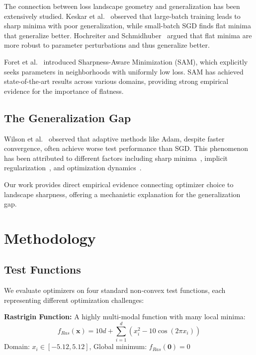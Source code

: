 \documentclass[12pt,a4paper]{article}
\begin{document}
The connection between loss landscape geometry and generalization has been extensively studied. Keskar et al.~\cite{keskar2016large} observed that large-batch training leads to sharp minima with poor generalization, while small-batch SGD finds flat minima that generalize better. Hochreiter and Schmidhuber~\cite{hochreiter1997flat} argued that flat minima are more robust to parameter perturbations and thus generalize better.

Foret et al.~\cite{foret2020sharpness} introduced Sharpness-Aware Minimization (SAM), which explicitly seeks parameters in neighborhoods with uniformly low loss. SAM has achieved state-of-the-art results across various domains, providing strong empirical evidence for the importance of flatness.

\subsection{The Generalization Gap}

Wilson et al.~\cite{wilson2017marginal} observed that adaptive methods like Adam, despite faster convergence, often achieve worse test performance than SGD. This phenomenon has been attributed to different factors including sharp minima~\cite{keskar2016large}, implicit regularization~\cite{smith2021origin}, and optimization dynamics~\cite{jastrzebski2017three}.

Our work provides direct empirical evidence connecting optimizer choice to landscape sharpness, offering a mechanistic explanation for the generalization gap.

\section{Methodology}
\label{sec:methodology}

\subsection{Test Functions}

We evaluate optimizers on four standard non-convex test functions, each representing different optimization challenges:

\textbf{Rastrigin Function:} A highly multi-modal function with many local minima:
\begin{equation}
f_{Ras}(\mathbf{x}) = 10d + \sum_{i=1}^{d} \left(x_i^2 - 10\cos(2\pi x_i)\right)
\end{equation}
Domain: $x_i \in [-5.12, 5.12]$, Global minimum: $f_{Ras}(\mathbf{0}) = 0$
\end{document}
